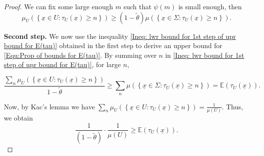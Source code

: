 \documentclass[11pt, reqno]{amsart}
\theoremstyle{plain}%
\theoremstyle{definition}
\theoremstyle{definition}
\def\E{\mathbb E}
\def\ulx{\underline{x}}
\numberwithin{equation}{section}
\begin{document}
\begin{proof}
We can fix some large enough $m$ such that $\psi(m)$ is small enough, then
\begin{equation}\label{Ineq: lwr bound for 1st step of upr bound for E(tau)}
\mu_U \left(\left\{\ulx\in U: \tau_U(\ulx)\ge n \right\}\right)\ge ({1-\tilde{\theta}}) \mu \left(\left\{\ulx\in \Sigma: \tau_U(\ulx)\ge n \right\} \right).\end{equation}


\textbf{Second step.} We now use the inequality \eqref{Ineq: lwr bound for 1st step of upr bound for E(tau)} obtained in the first step to derive an upper bound for \eqref{Equ:Prop of bounds for E(tau)}. By summing over $n$ in \eqref{Ineq: lwr bound for 1st step of upr bound for E(tau)}, for large $n$,

$$\frac{\sum_n \mu_U \left( \left\{\ulx\in U: \tau_U(\ulx)\ge n \right\}\right)}{1-\tilde{\theta}}\ge  \sum_n \mu \left( \left\{\ulx\in \Sigma: \tau_U(\ulx)\ge n \right\}\right)= \E(\tau_U(\ulx)).$$

Now, by Kac's lemma we have $\sum_n \mu_U \left( \left\{\ulx\in U: \tau_U(\ulx)\ge n \right\}\right)=\frac{1}{\mu(U)}$. Thus, we obtain
$$ \frac{1}{(1-\tilde{\theta})}\cdot\frac{1}{\mu(U)}\ge \E(\tau_U(\ulx)).$$


\end{proof}
\end{document}
